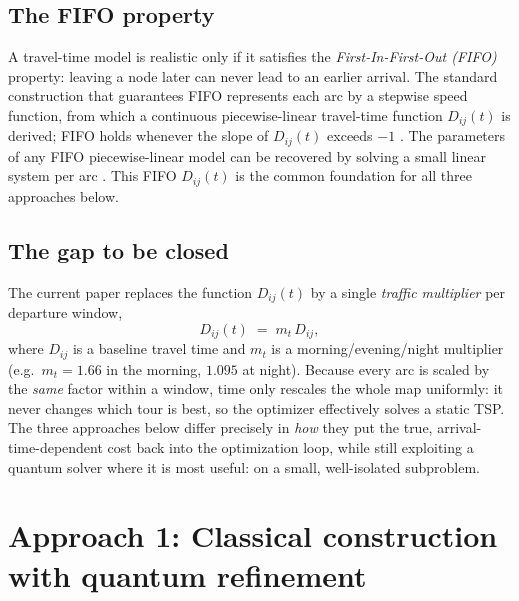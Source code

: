 \documentclass[11pt]{article}
\newcommand{\emphasize}[1]{\textcolor{emphasisblue}{\textit{#1}}}
\newcommand{\emphteal}[1]{\textcolor{emphasisteal}{\textit{#1}}}
\begin{document}
\subsection{The FIFO property}
A travel-time model is realistic only if it satisfies the
\emphteal{First-In-First-Out (FIFO)} property: leaving a node later can never lead to an
earlier arrival. The standard construction that guarantees FIFO represents each arc by a
stepwise speed function, from which a continuous piecewise-linear travel-time function
$D_{ij}(t)$ is derived; FIFO holds whenever the slope of $D_{ij}(t)$ exceeds $-1$
\cite{ichoua2003vehicle}. The parameters of any FIFO piecewise-linear model can be
recovered by solving a small linear system per arc \cite{ghiani2014note}. This FIFO
$D_{ij}(t)$ is the common foundation for all three approaches below.

\subsection{The gap to be closed}
The current paper replaces the function $D_{ij}(t)$ by a single
\emphasize{traffic multiplier} per departure window,
\[
  D_{ij}(t) \;=\; m_t\, D_{ij},
\]
where $D_{ij}$ is a baseline travel time and $m_t$ is a morning/evening/night multiplier
(e.g.\ $m_t = 1.66$ in the morning, $1.095$ at night). Because every arc is scaled by the
\emph{same} factor within a window, time only rescales the whole map uniformly: it never
changes which tour is best, so the optimizer effectively solves a static TSP. The three
approaches below differ precisely in \emph{how} they put the true, arrival-time-dependent
cost back into the optimization loop, while still exploiting a quantum solver where it is
most useful: on a small, well-isolated subproblem.

\section{Approach 1: Classical construction with quantum refinement}
\label{sec:approach1}
\end{document}
